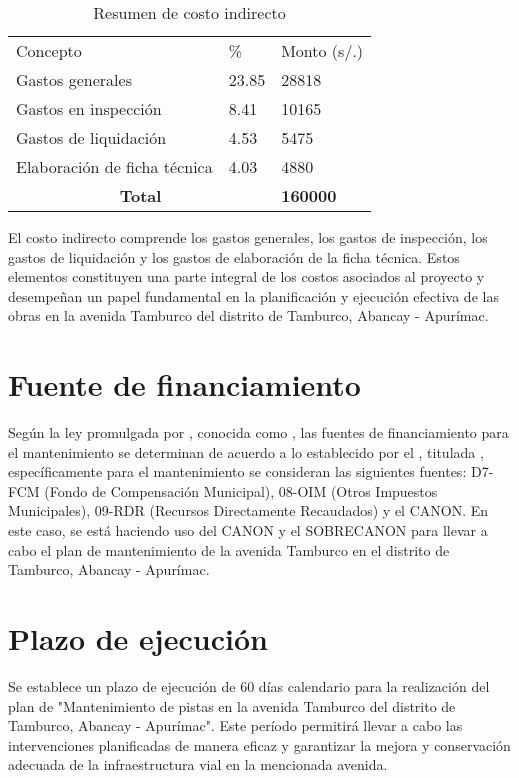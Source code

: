\begin{table}[h]
	\centering
	\begin{tabular}{lll}
		\toprule
		Concepto                           & \%              & Monto (s/.) \\ \cmidrule{1-3}
		Gastos generales                   & 23.85           & 28818       \\ %
		Gastos en inspección               & 8.41            & 10165       \\
		Gastos de liquidación              & 4.53            & 5475        \\
		Elaboración de ficha técnica       & 4.03            & 4880        \\\midrule
		\multicolumn{2}{c}{\textbf{Total}} & \textbf{160000}               \\ \bottomrule
	\end{tabular}
	\caption{Resumen de costo indirecto }
	\label{rps2}
\end{table}

El costo indirecto comprende los gastos generales, los gastos de inspección, los gastos de liquidación y los gastos de elaboración de la ficha técnica. Estos elementos constituyen una parte integral de los costos asociados al proyecto y desempeñan un papel fundamental en la planificación y ejecución efectiva de las obras en la avenida Tamburco del distrito de Tamburco, Abancay - Apurímac.


\section{Fuente de financiamiento}

Según la ley promulgada por \cite{CongresoRepublica2022}, conocida como , las fuentes de financiamiento para el mantenimiento se determinan de acuerdo a lo establecido por el \cite{CongresoRepublica2003}, titulada , específicamente para el mantenimiento se consideran las siguientes fuentes: D7-FCM (Fondo de Compensación Municipal), 08-OIM (Otros Impuestos Municipales), 09-RDR (Recursos Directamente Recaudados) y el CANON. En este caso, se está haciendo uso del CANON y el SOBRECANON para llevar a cabo el plan de mantenimiento de la avenida Tamburco en el distrito de Tamburco, Abancay - Apurímac.

\section{Plazo de ejecución}
Se establece un plazo de ejecución de 60 días calendario para la realización del plan de "Mantenimiento de pistas en la avenida Tamburco del distrito de Tamburco, Abancay - Apurímac". Este período permitirá llevar a cabo las intervenciones planificadas de manera eficaz y garantizar la mejora y conservación adecuada de la infraestructura vial en la mencionada avenida.

